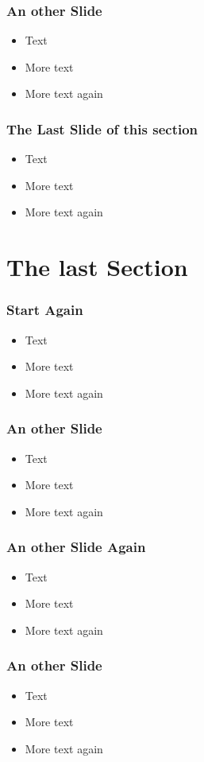 \documentclass[handout,xcolor=pdftex,dvipsnames,table]{beamer}
\begin{document}
\begin{frame} 
\frametitle{An other Slide}
\begin{itemize}[<+->]
 \item Text
 \item More text
 \item More text again
\end{itemize}
\end{frame}

\begin{frame} 
\frametitle{The Last Slide of this section}
\begin{itemize}[<+->]
 \item Text
 \item More text
 \item More text again
\end{itemize}
\end{frame}

\section{The last Section}
\begin{frame} 
\frametitle{Start Again}
\begin{itemize}[<+->]
 \item Text
 \item More text
 \item More text again
\end{itemize}
\end{frame}

\begin{frame} 
\frametitle{An other Slide}
\begin{itemize}[<+->]
 \item Text
 \item More text
 \item More text again
\end{itemize}
\end{frame}

\begin{frame} 
\frametitle{An other Slide Again}
\begin{itemize}[<+->]
 \item Text
 \item More text
 \item More text again
\end{itemize}
\end{frame}

\begin{frame} 
\frametitle{An other Slide}
\begin{itemize}[<+->]
 \item Text
 \item More text
 \item More text again
\end{itemize}
\end{frame}
\end{document}
